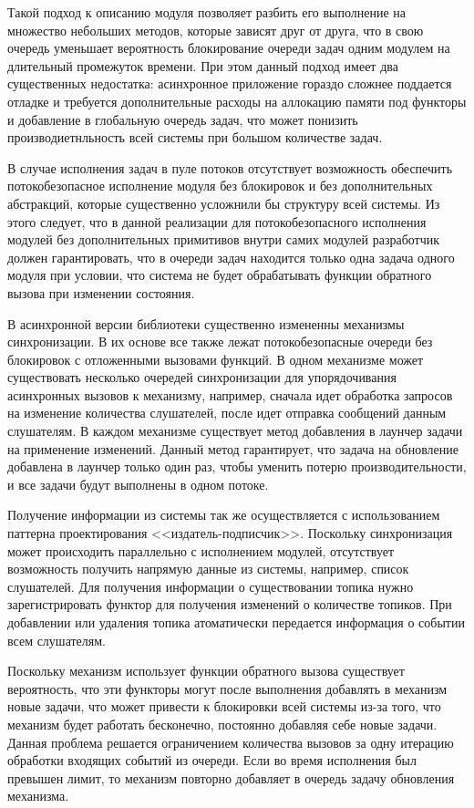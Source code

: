 Такой подход к описанию модуля позволяет разбить его выполнение на множество небольших методов, которые зависят друг от друга, что в свою очередь уменьшает вероятность блокирование очереди задач одним модулем на длительный промежуток времени. При этом данный подход имеет два существенных недостатка: асинхронное приложение гораздо сложнее поддается отладке и требуется дополнительные расходы на аллокацию памяти под функторы и добавление в глобальную очередь задач, что может понизить производиетнльность всей системы при большом количестве задач.

В случае исполнения задач в пуле потоков отсутствует возможность обеспечить потокобезопасное исполнение модуля без блокировок и без дополнительных абстракций, которые существенно усложнили бы структуру всей системы. Из этого следует, что в данной реализации для потокобезопасного исполнения модулей без дополнительных примитивов внутри самих модулей разработчик должен гарантировать, что в очереди задач находится только одна задача одного модуля при условии, что система не будет обрабатывать функции обратного вызова при изменении состояния.

В асинхронной версии библиотеки существенно измененны механизмы синхронизации. В их основе все также лежат потокобезопасные очереди без блокировок с отложенными вызовами функций. В одном механизме может существовать несколько очередей синхронизации для упорядочивания асинхронных вызовов к механизму, например, сначала идет обработка запросов на изменение количества слушателей, после идет отправка сообщений данным слушателям. В каждом механизме существует метод добавления в лаунчер задачи на применение изменений. Данный метод гарантирует, что задача на обновление добавлена в лаунчер только один раз, чтобы уменить потерю производительности, и все задачи будут выполнены в одном потоке.

Получение информации из системы так же осуществляется с использованием паттерна проектирования <<издатель-подписчик>>. Поскольку синхронизация может происходить параллельно с исполнением модулей, отсутствует возможность получить напрямую данные из системы, например, список слушателей. Для получения информации о существовании топика нужно зарегистрировать функтор для получения изменений о количестве топиков. При добавлении или удаления топика атоматически передается информация о событии всем слушателям.

Поскольку механизм использует функции обратного вызова существует вероятность, что эти функторы могут после выполнения добавлять в механизм новые задачи, что может привести к блокировки всей системы из-за того, что механизм будет работать бесконечно, постоянно добавляя себе новые задачи. Данная проблема решается ограничением количества вызовов за одну итерацию обработки входящих событий из очереди. Если во время исполнения был превышен лимит, то механизм повторно добавляет в очередь задачу обновления механизма.

